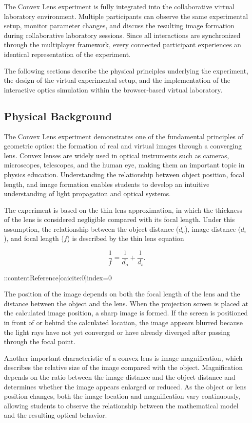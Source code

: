 The Convex Lens experiment is fully integrated into the collaborative virtual laboratory environment. Multiple participants can observe the same experimental setup, monitor parameter changes, and discuss the resulting image formation during collaborative laboratory sessions. Since all interactions are synchronized through the multiplayer framework, every connected participant experiences an identical representation of the experiment.

The following sections describe the physical principles underlying the experiment, the design of the virtual experimental setup, and the implementation of the interactive optics simulation within the browser-based virtual laboratory.

\subsection{Physical Background}

The Convex Lens experiment demonstrates one of the fundamental principles of geometric optics: the formation of real and virtual images through a converging lens. Convex lenses are widely used in optical instruments such as cameras, microscopes, telescopes, and the human eye, making them an important topic in physics education. Understanding the relationship between object position, focal length, and image formation enables students to develop an intuitive understanding of light propagation and optical systems.

The experiment is based on the thin lens approximation, in which the thickness of the lens is considered negligible compared with its focal length. Under this assumption, the relationship between the object distance ($d_o$), image distance ($d_i$), and focal length ($f$) is described by the thin lens equation

\[
\frac{1}{f}=\frac{1}{d_o}+\frac{1}{d_i}.
\]


::contentReference[oaicite:0]{index=0}


The position of the image depends on both the focal length of the lens and the distance between the object and the lens. When the projection screen is placed at the calculated image position, a sharp image is formed. If the screen is positioned in front of or behind the calculated location, the image appears blurred because the light rays have not yet converged or have already diverged after passing through the focal point.

Another important characteristic of a convex lens is image magnification, which describes the relative size of the image compared with the object. Magnification depends on the ratio between the image distance and the object distance and determines whether the image appears enlarged or reduced. As the object or lens position changes, both the image location and magnification vary continuously, allowing students to observe the relationship between the mathematical model and the resulting optical behavior.

